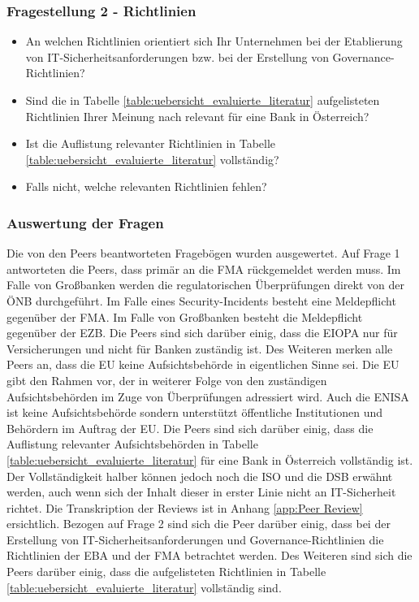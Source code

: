 \subsubsection{Fragestellung 2 - Richtlinien}
\begin{itemize}
    \item An welchen Richtlinien orientiert sich Ihr Unternehmen bei der Etablierung von IT-Sicherheitsanforderungen bzw. bei der Erstellung von Governance-Richtlinien?
    \item Sind die in Tabelle \ref{table:uebersicht_evaluierte_literatur} aufgelisteten Richtlinien Ihrer Meinung nach relevant für eine Bank in Österreich?
    \item Ist die Auflistung relevanter Richtlinien in Tabelle \ref{table:uebersicht_evaluierte_literatur} vollständig?
    \item Falls nicht, welche relevanten Richtlinien fehlen?
\end{itemize}
\bigbreak

\subsubsection{Auswertung der Fragen}
Die von den Peers beantworteten Fragebögen wurden ausgewertet. Auf Frage 1 antworteten die Peers, dass primär an die FMA rückgemeldet werden muss. Im Falle von Großbanken werden die regulatorischen Überprüfungen direkt von der ÖNB durchgeführt. Im Falle eines Security-Incidents besteht eine Meldepflicht gegenüber der FMA. Im Falle von Großbanken besteht die Meldepflicht gegenüber der EZB. Die Peers sind sich darüber einig, dass die EIOPA nur für Versicherungen und nicht für Banken zuständig ist. Des Weiteren merken alle Peers an, dass die EU keine Aufsichtsbehörde in eigentlichen Sinne sei. Die EU gibt den Rahmen vor, der in weiterer Folge von den zuständigen Aufsichtsbehörden im Zuge von Überprüfungen adressiert wird. Auch die ENISA ist keine Aufsichtsbehörde sondern unterstützt öffentliche Institutionen und Behördern im Auftrag der EU. 
Die Peers sind sich darüber einig, dass die Auflistung relevanter Aufsichtsbehörden in Tabelle \ref{table:uebersicht_evaluierte_literatur} für eine Bank in Österreich vollständig ist. Der Vollständigkeit halber können jedoch noch die ISO und die DSB erwähnt werden, auch wenn sich der Inhalt dieser in erster Linie nicht an IT-Sicherheit richtet. Die Transkription der Reviews ist in Anhang \ref{app:Peer Review} ersichtlich.
\bigbreak
Bezogen auf Frage 2 sind sich die Peer darüber einig, dass bei der Erstellung von IT-Sicherheitsanforderungen und Governance-Richtlinien die Richtlinien der EBA und der FMA betrachtet werden. Des Weiteren sind sich die Peers darüber einig, dass die aufgelisteten Richtlinien in Tabelle \ref{table:uebersicht_evaluierte_literatur} vollständig sind. 

